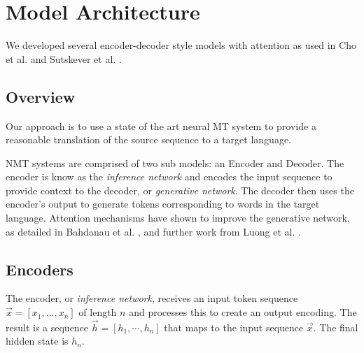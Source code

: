 \documentclass[twoside,twocolumn]{article}
\begin{document}
\section{Model Architecture}
\label{sec:models}
We developed several encoder-decoder style models with attention
as used in Cho et al. \cite{cho2014learning}
and Sutskever et al. \cite{sutskever2014sequence}.
\subsection{Overview}
Our approach is to use a state of the art neural MT system to
provide a reasonable translation of the source sequence to a target language.

NMT systems are comprised of two sub models: an Encoder and Decoder. The
encoder is know as the \emph{inference network} and encodes the input sequence
to provide context to the decoder, or \emph{generative network}. The decoder
then uses the encoder's output to generate tokens corresponding to words
in the target language. Attention mechanisms have shown to improve the
generative network, as detailed in Bahdanau et al. \cite{bahdanau2014neural},
and further work from Luong et al. \cite{luong2015effective}.

\subsection{Encoders}
The encoder, or \emph{inference network}, receives an input token sequence
$\vec{x} = \left[{x_1,\hdots, x_n}\right]$ of length $n$ and processes
this to create an output encoding. The result is a sequence
$\vec{h} = \left[{h_1, \cdots, h_{n}}\right]$ that
maps to the input sequence $\vec{x}$. The final hidden state is $h_n$.
\end{document}
